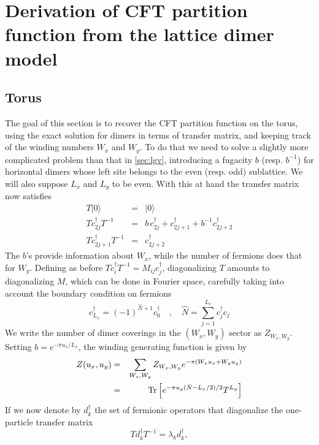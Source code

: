 \documentclass[11pt]{iopart}
\begin{document}
\section[\;\;\;\;\;\;\;\;\;\;\;\;\;\;CFT partition functions from the lattice dimer model]{Derivation of CFT partition function from the lattice dimer model}
\label{sec:dimers_exact}
 \subsection[\;\;\;\;\;\;\;\;\;\;\;\;\;\; Torus]{Torus}
The goal of this section is to recover the CFT partition function on the torus, using the exact solution for dimers in terms of transfer matrix, and keeping track of the winding numbers $W_x$ and $W_y$. To do that we need to solve a slightly more complicated problem than that in \ref{sec:lgv}, introducing a fugacity $b$ (resp. $b^{-1}$) for horizontal dimers whose left site belongs to the even (resp. odd) sublattice. We will also suppose $L_x$ and $L_y$ to be even. With this at hand the transfer matrix now satisfies
\begin{eqnarray}
T|0\rangle&=&|0\rangle\\
T c_{2j}^\dag T^{-1}&=&b \,c_{2j}^\dag+c_{2j+1}^\dag +b^{-1}c_{2j+2}^\dag\\
T c_{2j+1}^\dag T^{-1}&=&c_{2j+2}^\dag
\end{eqnarray}
The $b$'s provide information about $W_x$, while the number of fermions does that for $W_y$. 
Defining as before $T c_i^\dag T^{-1}=M_{ij} c_j^\dag$, diagonalizing $T$ amounts to diagonalizing $M$, which can be done in Fourier space, carefully taking into account the boundary condition on fermions
\begin{equation}
 c_{L_x}^\dag=(-1)^{\hat{N}+1}c_0^\dag\quad,\quad \hat{N}=\sum_{j=1}^{L_x} c^\dag_j c_j
\end{equation}
We write the number of dimer coverings in the $(W_x,W_y)$ sector as $Z_{W_x,W_y}$. Setting $b=e^{-\pi u_x/L_x}$, the winding generating function is given by
\begin{eqnarray}
 Z(u_x,u_y)&=&\sum_{W_x,W_y} Z_{W_x,W_y}e^{-\pi (W_x u_x+W_y u_y)}\\\label{eq:Z_tm}
 &=&{\rm Tr}\left[\displaystyle{e^{-\pi u_y(\hat{N}-L_x/2)/2}T^{L_y}}\right]
\end{eqnarray}
If we now denote by $d_k^\dag$ the set of fermionic operators that diagonalize the one-particle transfer matrix
\begin{equation}
 T d_k^\dag T^{-1}=\lambda_k d_k^\dag,
\end{equation}
\end{document}

